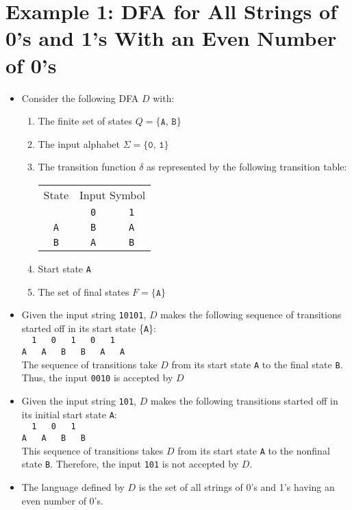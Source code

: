 \documentclass[]{article}
\begin{document}
\section{Example 1: DFA for All Strings of 0's and 1's With an Even Number of 
0's}
  \begin{itemize}
    \item Consider the following DFA $D$ with:
      \begin{enumerate}
        \item The finite set of states $Q = \{ \texttt{A, B} \}$
        \item The input alphabet $\Sigma = \{ \texttt{0, 1} \}$
        \item The transition function $\delta$ as represented by the following 
        transition table:
        
          \begin{tabular}{|c|c|c|}
            \hline
            State & \multicolumn{2}{|c|}{Input Symbol} \\ \cline{2-3}
                  & \texttt{0} & \texttt{1} \\ \hline
            \texttt{A} & \texttt{B} & \texttt{A} \\ \hline
            \texttt{B} & \texttt{A} & \texttt{B} \\ \hline
          \end{tabular}
        
        \item Start state \texttt{A}
        \item The set of final states $F = \{ \texttt{A} \}$
      \end{enumerate}
    \item Given the input string \texttt{10101}, $D$ makes the following 
    sequence of transitions started off in its start state \{\texttt{A}\}:\\
    \verb|  1   0   1   0   1  |\\
    \verb|A   A   B   B   A   A| \\
    The sequence of transitions take $D$ from its start state \texttt{A} to the 
    final state \texttt{B}. Thus, the input \texttt{0010} is accepted by $D$
    \item Given the input string \texttt{101}, $D$ makes the following 
    transitions started off in its initial start state \texttt{A}:\\
    \verb|  1   0   1  | \\
    \verb|A   A   B   B| \\
    This sequence of transitions takes $D$ from its start state \texttt{A} to 
    the nonfinal state \texttt{B}. Therefore, the input \texttt{101} is not 
    accepted by $D$.
    \item The language defined by $D$ is the set of all strings of 0's and 1's 
    having an even number of 0's.
  \end{itemize}
\end{document}
